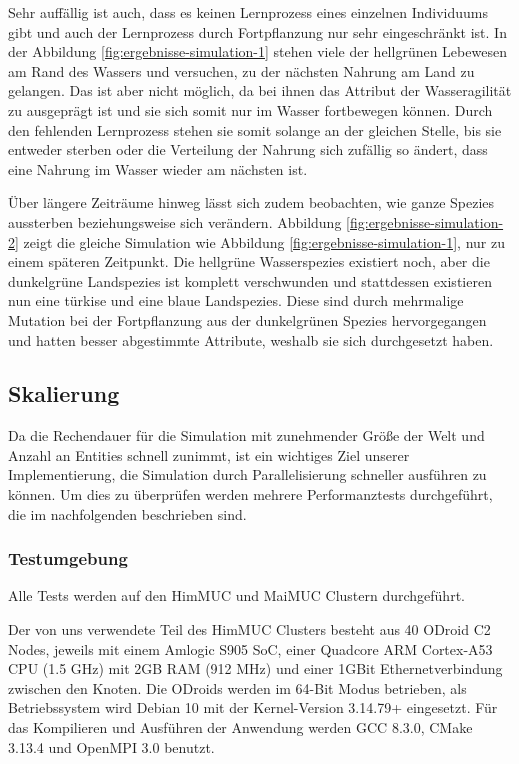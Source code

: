 \documentclass[course=erap]{aspdoc}
\begin{document}
Sehr auffällig ist auch, dass es keinen Lernprozess eines einzelnen Individuums gibt und auch der Lernprozess durch Fortpflanzung nur sehr eingeschränkt ist. In der Abbildung \ref{fig:ergebnisse-simulation-1} stehen viele der hellgrünen Lebewesen am Rand des Wassers und versuchen, zu der nächsten Nahrung am Land zu gelangen. Das ist aber nicht möglich, da bei ihnen das Attribut der Wasseragilität zu ausgeprägt ist und sie sich somit nur im Wasser fortbewegen können. Durch den fehlenden Lernprozess stehen sie somit solange an der gleichen Stelle, bis sie entweder sterben oder die Verteilung der Nahrung sich zufällig so ändert, dass eine Nahrung im Wasser wieder am nächsten ist.

Über längere Zeiträume hinweg lässt sich zudem beobachten, wie ganze Spezies aussterben beziehungsweise sich verändern. Abbildung \ref{fig:ergebnisse-simulation-2} zeigt die gleiche Simulation wie Abbildung \ref{fig:ergebnisse-simulation-1}, nur zu einem späteren Zeitpunkt. Die hellgrüne Wasserspezies existiert noch, aber die dunkelgrüne Landspezies ist komplett verschwunden und stattdessen existieren nun eine türkise und eine blaue Landspezies. Diese sind durch mehrmalige Mutation bei der Fortpflanzung aus der dunkelgrünen Spezies hervorgegangen und hatten besser abgestimmte Attribute, weshalb sie sich durchgesetzt haben.

\subsection{Skalierung}
Da die Rechendauer für die Simulation mit zunehmender Größe der Welt und Anzahl an Entities schnell zunimmt, ist ein wichtiges Ziel unserer Implementierung, die Simulation durch Parallelisierung schneller ausführen zu können. Um dies zu überprüfen werden mehrere Performanztests durchgeführt, die im nachfolgenden beschrieben sind.

\subsubsection{Testumgebung}
Alle Tests werden auf den HimMUC und MaiMUC Clustern durchgeführt.

Der von uns verwendete Teil des HimMUC Clusters besteht aus 40 ODroid C2 Nodes, jeweils mit einem Amlogic S905 SoC, einer Quadcore ARM Cortex-A53 CPU (1.5 GHz) mit 2GB RAM (912 MHz) und einer 1GBit Ethernetverbindung zwischen den Knoten. Die ODroids werden im 64-Bit Modus betrieben, als Betriebssystem wird Debian 10 mit der Kernel-Version 3.14.79+ eingesetzt. Für das Kompilieren und Ausführen der Anwendung werden GCC 8.3.0, CMake 3.13.4 und OpenMPI 3.0 benutzt.
\end{document}
